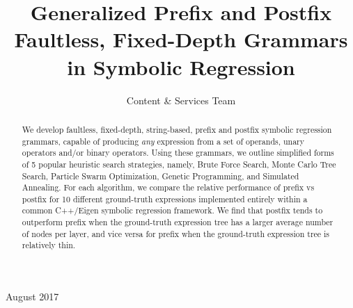 \documentclass[12pt]{iopart}
\begin{document}
\title[Author guidelines for IOP Publishing journals in  \LaTeXe]{Generalized Prefix and Postfix Faultless, Fixed-Depth Grammars in Symbolic Regression}

\author{Content \& Services Team}

\address{IOP Publishing, Temple Circus, Temple Way, Bristol BS1 6HG, UK}
\vspace{10pt}
\begin{indented}
\item[]August 2017
\end{indented}

\begin{abstract}
We develop faultless, fixed-depth, string-based, prefix and postfix symbolic regression grammars, capable of producing \emph{any} expression from a set of operands, unary operators and/or binary operators. Using these grammars, we outline simplified forms of 5 popular heuristic search strategies, namely, Brute Force Search,  Monte Carlo Tree Search, Particle Swarm Optimization, Genetic Programming, and Simulated Annealing. For each algorithm, we compare the relative performance of prefix vs postfix for 10 different ground-truth expressions implemented entirely within a common C++/Eigen symbolic regression framework. We find that postfix tends to outperform prefix when the ground-truth expression tree has a larger average number of nodes per layer, and vice versa for prefix when the ground-truth expression tree is relatively thin.
\end{abstract}

%
%
%
% 
%
\end{document}

